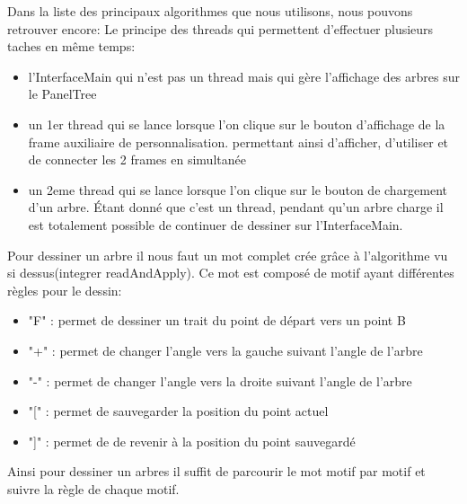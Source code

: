 \documentclass[a4paper,12pt]{article}
\begin{document}
Dans la liste des principaux algorithmes que nous utilisons, nous pouvons retrouver encore:
Le principe des threads qui permettent d'effectuer plusieurs taches en même temps:\\
\begin{itemize}[label=\textbullet, font=\small]
    \item l'InterfaceMain qui n'est pas un thread mais qui gère l'affichage des arbres sur le PanelTree
    \item un 1er thread qui se lance lorsque l'on clique sur le bouton d'affichage de la frame auxiliaire de personnalisation. permettant ainsi d'afficher, d'utiliser et de connecter les 2 frames en simultanée
    \item un 2eme thread qui se lance lorsque l'on clique sur le bouton de chargement d'un arbre. Étant donné que c'est un thread, pendant qu'un arbre charge il est totalement possible de continuer de dessiner sur l'InterfaceMain.\\
\end{itemize}



Pour dessiner un arbre il nous faut un mot complet crée grâce à l'algorithme vu si dessus(integrer readAndApply). Ce mot est composé de motif ayant différentes règles pour le dessin:
\begin{itemize}[label=\textbullet, font=\small]
    \item "F" : permet de dessiner un trait du point de départ vers un point B
    \item "+" : permet de changer l'angle vers la gauche suivant l'angle de l'arbre
    \item "-" : permet de changer l'angle vers la droite suivant l'angle de l'arbre
    \item "[" : permet de sauvegarder la position du point actuel
    \item "]" : permet de de revenir à la position du point sauvegardé\\
\end{itemize}
Ainsi pour dessiner un arbres il suffit de parcourir le mot motif par motif et suivre la règle de chaque motif.
\end{document}
